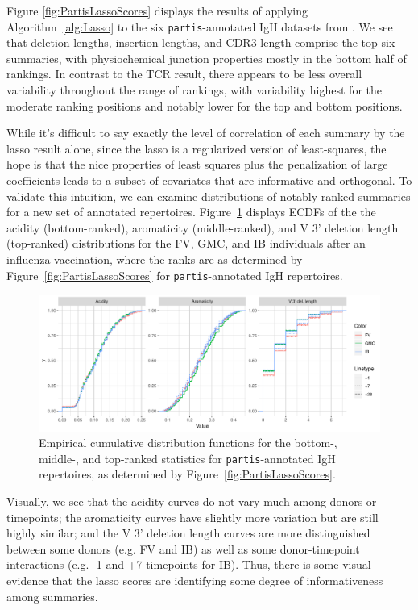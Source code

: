 \documentclass{article}
\newcommand{\partis}{\texttt{partis}}
\begin{document}
Figure \ref{fig:PartisLassoScores} displays the results of applying Algorithm~\ref{alg:Lasso} to the six \partis-annotated IgH datasets from \cite{Gupta2017-ve}.
We see that deletion lengths, insertion lengths, and CDR3 length comprise the top six summaries, with physiochemical junction properties mostly in the bottom half of rankings.
In contrast to the TCR result, there appears to be less overall variability throughout the range of rankings, with variability highest for the moderate ranking positions and notably lower for the top and bottom positions.

While it's difficult to say exactly the level of correlation of each summary by the lasso result alone, since the lasso is a regularized version of least-squares, the hope is that the nice properties of least squares plus the penalization of large coefficients leads to a subset of covariates that are informative and orthogonal.
To validate this intuition, we can examine distributions of notably-ranked summaries for a new set of annotated repertoires.
Figure~\ref{fig:LassoValidation} displays ECDFs of the the acidity (bottom-ranked), aromaticity (middle-ranked), and V 3' deletion length (top-ranked) distributions for the FV, GMC, and IB individuals after an influenza vaccination, where the ranks are as determined by Figure~\ref{fig:PartisLassoScores} for \partis-annotated IgH repertoires.
\begin{figure}
	\includegraphics[width=\linewidth]{Figures/Lasso/validation_ecdfs.pdf}
	\caption{Empirical cumulative distribution functions for the bottom-, middle-, and top-ranked statistics for \partis-annotated IgH repertoires, as determined by Figure~\ref{fig:PartisLassoScores}.}
	\label{fig:LassoValidation}
\end{figure}
Visually, we see that the acidity curves do not vary much among donors or timepoints; the aromaticity curves have slightly more variation but are still highly similar; and the V 3' deletion length curves are more distinguished between some donors (e.g. FV and IB) as well as some donor-timepoint interactions (e.g. -1 and +7 timepoints for IB).
Thus, there is some visual evidence that the lasso scores are identifying some degree of informativeness among summaries.
\end{document}

